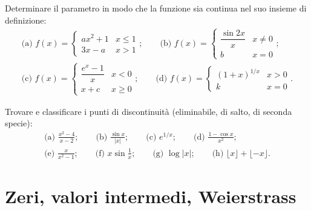 \begin{esercizio}[\liv{1}]
Determinare il parametro in modo che la funzione sia continua nel suo insieme di definizione:
\begin{gather*}
\text{(a) }f(x)=\begin{cases}ax^2+1 & x\le1\\ 3x-a & x>1\end{cases};\qquad \text{(b) }f(x)=\begin{cases}\dfrac{\sin2x}x & x\ne0\\ b & x=0\end{cases};\\ \text{(c) }f(x)=\begin{cases}\dfrac{e^x-1}x & x<0\\ x+c & x\ge0\end{cases};\qquad \text{(d) }f(x)=\begin{cases}(1+x)^{1/x} & x>0\\ k & x=0\end{cases}.
\end{gather*}
\end{esercizio}

\begin{esercizio}[\liv{2}]
Trovare e classificare i punti di discontinuità (eliminabile, di salto, di seconda specie):
\begin{gather*}
\text{(a) }\frac{x^2-4}{x-2};\qquad \text{(b) }\frac{\sin x}{|x|};\qquad \text{(c) }e^{1/x};\qquad \text{(d) }\frac{1-\cos x}{x^2};\\
\text{(e) }\frac x{x^2-1};\qquad \text{(f) }x\sin\frac1x;\qquad \text{(g) }\log|x|;\qquad \text{(h) }\lfloor x\rfloor+\lfloor-x\rfloor.
\end{gather*}
\end{esercizio}

\section{Zeri, valori intermedi, Weierstrass}

